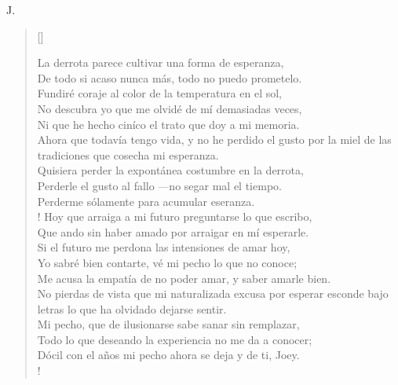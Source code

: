 \documentclass[11pt, a4paper]{article} %
\newcommand{\poemauthorright}[1]{\nopagebreak{\raggedleft\footnotesize\textsc{#1}\par}} %
\begin{document}
{ J}.


\poemtitle{}

\settowidth{\versewidth}{If you can meet with Triumph and Disaster} %

\begin{verse}[\versewidth]
{\scriptsize


La derrota parece cultivar una forma de esperanza, \\
De todo si acaso nunca más, todo no puedo prometelo. \\
Fundiré coraje al color de la temperatura en el sol, \\
No descubra yo que me olvidé de mí demasiadas veces, \\
Ni que he hecho ciníco el trato que doy a mi memoria. \\
Ahora que todavía tengo vida, y no he perdido el gusto por la miel de las tradiciones que cosecha mi esperanza. \\
Quisiera perder la expontánea costumbre en la derrota, \\
Perderle el gusto al fallo ---no segar mal el tiempo. \\
Perderme sólamente para acumular eseranza. \\!
Hoy que arraiga a mi futuro preguntarse lo que escribo, \\
Que ando sin haber amado por arraigar en mí esperarle. \\
Si el futuro me perdona las intensiones de amar hoy, \\
Yo sabré bien contarte, vé mi pecho lo que no conoce; \\  
Me acusa la empatía de no poder amar, y saber amarle bien. \\
No pierdas de vista que mi naturalizada excusa por esperar esconde bajo letras lo que ha olvidado dejarse sentir. \\
Mi pecho, que de ilusionarse sabe sanar sin remplazar, \\
Todo lo que deseando la experiencia no me da a conocer; \\
Dócil con el años mi pecho ahora se deja y de ti, Joey. \\!
}
\end{verse}


\poemauthorright{} %

\end{document}

